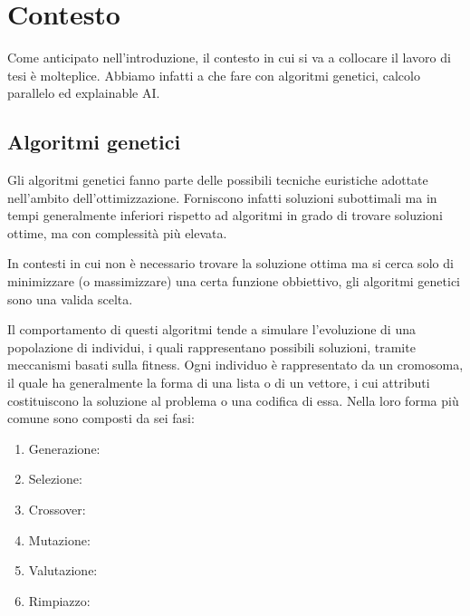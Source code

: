 \chapter{Contesto}

Come anticipato nell'introduzione, il contesto in cui si va a collocare il
lavoro di tesi è molteplice. Abbiamo infatti a che fare con algoritmi genetici,
calcolo parallelo ed explainable AI.

\section{Algoritmi genetici}

Gli algoritmi genetici fanno parte delle possibili tecniche euristiche adottate
nell'ambito dell'ottimizzazione. Forniscono infatti soluzioni subottimali ma
in tempi generalmente inferiori rispetto ad algoritmi in grado di trovare
soluzioni ottime, ma con complessità più elevata.

In contesti in cui non è necessario trovare la soluzione ottima ma si cerca
solo di minimizzare (o massimizzare) una certa funzione obbiettivo, gli
algoritmi genetici sono una valida scelta.

Il comportamento di questi algoritmi tende a simulare l'evoluzione di una
popolazione di individui, i quali rappresentano possibili soluzioni, tramite
meccanismi basati sulla fitness. Ogni individuo è rappresentato da un cromosoma,
il quale ha generalmente la forma di una lista o di un vettore, i cui attributi
costituiscono la soluzione al problema o una codifica di essa. Nella loro forma
più comune sono composti da sei fasi:

\begin{enumerate}
	\item Generazione:
	\item Selezione:
	\item Crossover:
	\item Mutazione:
	\item Valutazione:
	\item Rimpiazzo:
\end{enumerate}
